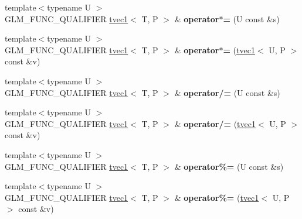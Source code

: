 \begin{DoxyCompactItemize}
\item 
\hypertarget{structglm_1_1detail_1_1tvec1_a38c64ab613b91222e34ffd8f8a97af7a}{{\footnotesize template$<$typename U $>$ }\\G\-L\-M\-\_\-\-F\-U\-N\-C\-\_\-\-Q\-U\-A\-L\-I\-F\-I\-E\-R \hyperlink{structglm_1_1detail_1_1tvec1}{tvec1}$<$ T, P $>$ \& {\bfseries operator$\ast$=} (U const \&s)}\label{structglm_1_1detail_1_1tvec1_a38c64ab613b91222e34ffd8f8a97af7a}

\item 
\hypertarget{structglm_1_1detail_1_1tvec1_ab5aa275a687a56ff82469c9c9334f145}{{\footnotesize template$<$typename U $>$ }\\G\-L\-M\-\_\-\-F\-U\-N\-C\-\_\-\-Q\-U\-A\-L\-I\-F\-I\-E\-R \hyperlink{structglm_1_1detail_1_1tvec1}{tvec1}$<$ T, P $>$ \& {\bfseries operator$\ast$=} (\hyperlink{structglm_1_1detail_1_1tvec1}{tvec1}$<$ U, P $>$ const \&v)}\label{structglm_1_1detail_1_1tvec1_ab5aa275a687a56ff82469c9c9334f145}

\item 
\hypertarget{structglm_1_1detail_1_1tvec1_ab1e87f461bbf279b20fc1e242b6e9f53}{{\footnotesize template$<$typename U $>$ }\\G\-L\-M\-\_\-\-F\-U\-N\-C\-\_\-\-Q\-U\-A\-L\-I\-F\-I\-E\-R \hyperlink{structglm_1_1detail_1_1tvec1}{tvec1}$<$ T, P $>$ \& {\bfseries operator/=} (U const \&s)}\label{structglm_1_1detail_1_1tvec1_ab1e87f461bbf279b20fc1e242b6e9f53}

\item 
\hypertarget{structglm_1_1detail_1_1tvec1_a76603a1972a31cd51a5281e3794ae2e3}{{\footnotesize template$<$typename U $>$ }\\G\-L\-M\-\_\-\-F\-U\-N\-C\-\_\-\-Q\-U\-A\-L\-I\-F\-I\-E\-R \hyperlink{structglm_1_1detail_1_1tvec1}{tvec1}$<$ T, P $>$ \& {\bfseries operator/=} (\hyperlink{structglm_1_1detail_1_1tvec1}{tvec1}$<$ U, P $>$ const \&v)}\label{structglm_1_1detail_1_1tvec1_a76603a1972a31cd51a5281e3794ae2e3}

\item 
\hypertarget{structglm_1_1detail_1_1tvec1_a9a958fd9f0255f2d40924adcb2e9eb0c}{{\footnotesize template$<$typename U $>$ }\\G\-L\-M\-\_\-\-F\-U\-N\-C\-\_\-\-Q\-U\-A\-L\-I\-F\-I\-E\-R \hyperlink{structglm_1_1detail_1_1tvec1}{tvec1}$<$ T, P $>$ \& {\bfseries operator\%=} (U const \&s)}\label{structglm_1_1detail_1_1tvec1_a9a958fd9f0255f2d40924adcb2e9eb0c}

\item 
\hypertarget{structglm_1_1detail_1_1tvec1_a711db33765785eacc65e313535211c76}{{\footnotesize template$<$typename U $>$ }\\G\-L\-M\-\_\-\-F\-U\-N\-C\-\_\-\-Q\-U\-A\-L\-I\-F\-I\-E\-R \hyperlink{structglm_1_1detail_1_1tvec1}{tvec1}$<$ T, P $>$ \& {\bfseries operator\%=} (\hyperlink{structglm_1_1detail_1_1tvec1}{tvec1}$<$ U, P $>$ const \&v)}\label{structglm_1_1detail_1_1tvec1_a711db33765785eacc65e313535211c76}


\end{DoxyCompactItemize}
